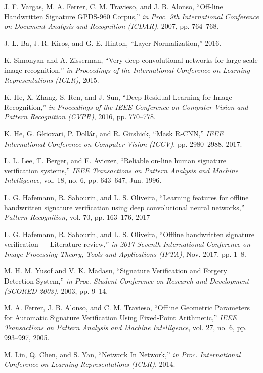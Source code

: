\begin{thebibliography}{10}
J. F. Vargas, M. A. Ferrer, C. M. Travieso, and J. B. Alonso, ``Off-line Handwritten Signature GPDS-960 Corpus,'' {\em in Proc. 9th International Conference on Document Analysis and Recognition (ICDAR)},
2007, pp. 764--768.

J. L. Ba, J. R. Kiros, and G. E. Hinton, ``Layer Normalization,''
2016.

K. Simonyan and A. Zisserman, ``Very deep convolutional networks for large-scale image recognition,'' {\em in Proceedings of the International Conference on Learning Representations (ICLR)},
2015.

K. He, X. Zhang, S. Ren, and J. Sun, ``Deep Residual Learning for Image Recognition,'' {\em in Proceedings of the IEEE Conference on Computer Vision and Pattern Recognition (CVPR)},
2016, pp. 770--778.

K. He, G. Gkioxari, P. Dollár, and R. Girshick, ``Mask R-CNN,'' {\em IEEE International Conference on Computer Vision (ICCV)}, pp. 2980--2988,
2017.

L. L. Lee, T. Berger, and E. Aviczer, ``Reliable on-line human signature verification systems,'' {\em IEEE Transactions on Pattern Analysis and Machine Intelligence}, vol. 18, no. 6, pp. 643--647,
Jun. 1996.

L. G. Hafemann, R. Sabourin, and L. S. Oliveira, ``Learning features for offline handwritten signature verification using deep convolutional neural networks,'' {\em Pattern Recognition}, vol. 70, pp. 163--176,
2017

L. G. Hafemann, R. Sabourin, and L. S. Oliveira, ``Offline handwritten signature verification — Literature review,'' {\em in 2017 Seventh International Conference on Image Processing Theory, Tools and Applications (IPTA)},
Nov. 2017, pp. 1--8.

M. H. M. Yusof and V. K. Madasu, ``Signature Verification and Forgery Detection System,'' {\em in Proc. Student Conference on Research and Development (SCORED 2003)},
2003, pp. 9--14.

M. A. Ferrer, J. B. Alonso, and C. M. Travieso, ``Offline Geometric Parameters for Automatic Signature Verification Using Fixed-Point Arithmetic,'' {\em IEEE Transactions on Pattern Analysis and Machine Intelligence}, vol. 27, no. 6, pp. 993--997,
2005.

M. Lin, Q. Chen, and S. Yan, ``Network In Network,'' {\em in Proc. International Conference on Learning Representations (ICLR)},
2014.


\end{thebibliography}
